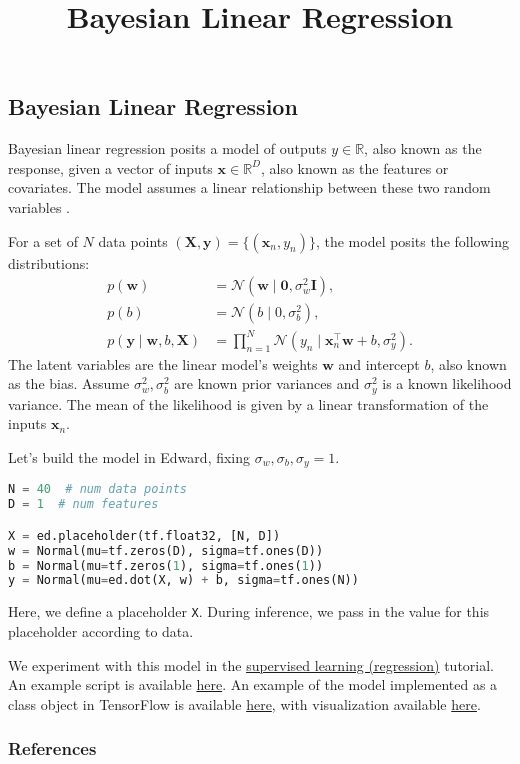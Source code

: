 \title{Bayesian Linear Regression}

\subsection{Bayesian Linear Regression}

Bayesian linear regression posits a model of
outputs $y\in\mathbb{R}$, also known as the response, given
a vector of inputs
$\mathbf{x}\in\mathbb{R}^D$, also known as the features or covariates.
The model assumes a
linear relationship between these two random variables
\citep{murphy2012machine}.

For a set of $N$ data points $(\mathbf{X},\mathbf{y})=\{(\mathbf{x}_n, y_n)\}$,
the model posits the following distributions:
\begin{align*}
  p(\mathbf{w})
  &=
  \mathcal{N}(\mathbf{w} \mid \mathbf{0}, \sigma_w^2\mathbf{I}),
  \\[1.5ex]
  p(b)
  &=
  \mathcal{N}(b \mid 0, \sigma_b^2),
  \\
  p(\mathbf{y} \mid \mathbf{w}, b, \mathbf{X})
  &=
  \prod_{n=1}^N
  \mathcal{N}(y_n \mid \mathbf{x}_n^\top\mathbf{w} + b, \sigma_y^2).
\end{align*}
The latent variables are the linear model's weights $\mathbf{w}$ and
intercept $b$, also known as the bias.
Assume $\sigma_w^2,\sigma_b^2$ are known prior variances and $\sigma_y^2$ is a
known likelihood variance. The mean of the likelihood is given by a
linear transformation of the inputs $\mathbf{x}_n$.

Let's build the model in Edward, fixing $\sigma_w,\sigma_b,\sigma_y=1$.
\begin{lstlisting}[language=Python]
N = 40  # num data points
D = 1  # num features

X = ed.placeholder(tf.float32, [N, D])
w = Normal(mu=tf.zeros(D), sigma=tf.ones(D))
b = Normal(mu=tf.zeros(1), sigma=tf.ones(1))
y = Normal(mu=ed.dot(X, w) + b, sigma=tf.ones(N))
\end{lstlisting}
Here, we define a placeholder \texttt{X}. During inference, we pass in
the value for this placeholder according to data.

We experiment with this model in the \href{/tutorials/supervised-regression}{supervised
learning (regression)} tutorial.
An example script is available
\href{https://github.com/blei-lab/edward/blob/master/examples/bayesian_linear_regression.py}
{here}.
An example of the model implemented as a class object in TensorFlow is
available
\href{https://github.com/blei-lab/edward/blob/master/examples/tf_bayesian_linear_regression.py}
{here}, with visualization available
\href{https://github.com/blei-lab/edward/blob/master/examples/tf_bayesian_linear_regression_plot.py}
{here}.

\subsubsection{References}\label{references}
